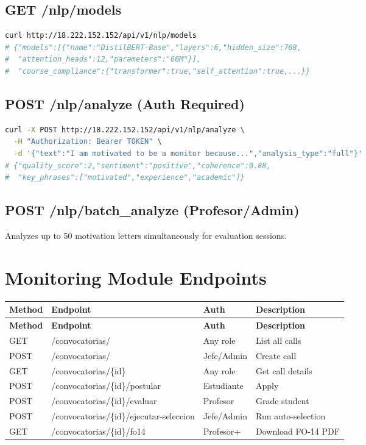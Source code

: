 \documentclass[12pt,a4paper]{report}
\begin{document}
\subsection{GET /nlp/models}
\begin{lstlisting}[language=bash]
curl http://18.222.152.152/api/v1/nlp/models
# {"models":[{"name":"DistilBERT-Base","layers":6,"hidden_size":768,
#  "attention_heads":12,"parameters":"66M"}],
#  "course_compliance":{"transformer":true,"self_attention":true,...}}
\end{lstlisting}

\subsection{POST /nlp/analyze (Auth Required)}
\begin{lstlisting}[language=bash]
curl -X POST http://18.222.152.152/api/v1/nlp/analyze \
  -H "Authorization: Bearer TOKEN" \
  -d '{"text":"I am motivated to be a monitor because...","analysis_type":"full"}'
# {"quality_score":2,"sentiment":"positive","coherence":0.88,
#  "key_phrases":["motivated","experience","academic"]}
\end{lstlisting}

\subsection{POST /nlp/batch\_analyze (Profesor/Admin)}
Analyzes up to 50 motivation letters simultaneously for evaluation sessions.

\section{Monitoring Module Endpoints}
\begin{longtable}{|p{1.5cm}|p{5cm}|p{3cm}|p{3.5cm}|}
\hline
\textbf{Method} & \textbf{Endpoint} & \textbf{Auth} & \textbf{Description} \\
\hline
\endfirsthead
\hline \textbf{Method} & \textbf{Endpoint} & \textbf{Auth} & \textbf{Description} \\ \hline \endhead
GET & /convocatorias/ & Any role & List all calls \\
\hline
POST & /convocatorias/ & Jefe/Admin & Create call \\
\hline
GET & /convocatorias/\{id\} & Any role & Get call details \\
\hline
POST & /convocatorias/\{id\}/postular & Estudiante & Apply \\
\hline
POST & /convocatorias/\{id\}/evaluar & Profesor & Grade student \\
\hline
POST & /convocatorias/\{id\}/ejecutar-seleccion & Jefe/Admin & Run auto-selection \\
\hline
GET & /convocatorias/\{id\}/fo14 & Profesor+ & Download FO-14 PDF \\
\hline
\end{longtable}
\end{document}
